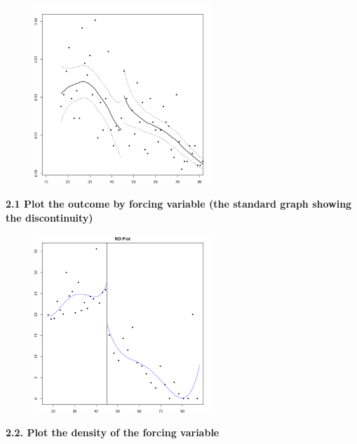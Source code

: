 \documentclass[a4paper]{article}
\begin{document}
\begin{figure}[!htb]
	\centering
	\includegraphics[width=0.6\textwidth]{Rplot1.png}
\end{figure}

\pagebreak

\noindent \textbf{2.1 Plot the outcome by forcing variable (the standard graph showing the discontinuity)}


\begin{figure}[!htb]
	\centering
	\includegraphics[width=0.6\textwidth]{Rplot2.png}
\end{figure}

\pagebreak
\noindent\textbf{2.2. Plot the density of the forcing variable}
\end{document}
